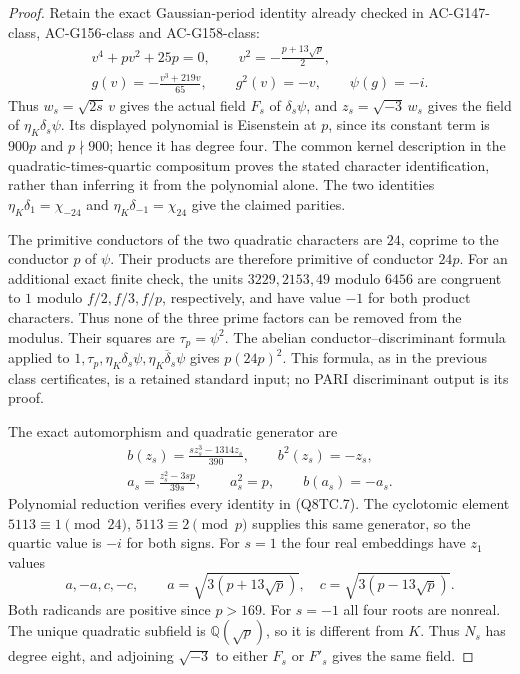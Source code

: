 \begin{proof}
Retain the exact Gaussian-period identity already checked in
AC-G147-class, AC-G156-class and AC-G158-class:
\[
 \begin{gathered}
 v^4+pv^2+25p=0,\qquad
 v^2=-\frac{p+13\sqrt p}{2},\\
 g(v)=-\frac{v^3+219v}{65},\qquad g^2(v)=-v,
                  \qquad\psi(g)=-i .
 \end{gathered}
 \tag{Q8TC.6}
\]
Thus $w_s=\sqrt{2s}\,v$ gives the actual field $F_s$ of
$\delta_s\psi$, and $z_s=\sqrt{-3}\,w_s$ gives the field
of $\eta_K\delta_s\psi$.
Its displayed polynomial is Eisenstein at $p$, since its constant
term is $900p$ and $p\nmid900$; hence it has degree four.
The common kernel description in the quadratic-times-quartic
compositum proves the stated character identification, rather
than inferring it from the polynomial alone.
The two identities
$\eta_K\delta_1=\chi_{-24}$ and
$\eta_K\delta_{-1}=\chi_{24}$ give the claimed parities.

The primitive conductors of the two quadratic characters are
$24$, coprime to the conductor $p$ of $\psi$.
Their products are therefore primitive of conductor $24p$.
For an additional exact finite check, the units
$3229,2153,49$ modulo $6456$ are congruent to $1$ modulo
$f/2,f/3,f/p$, respectively, and have value $-1$ for both
product characters.  Thus none of the three prime factors can
be removed from the modulus.
Their squares are $\tau_p=\psi^2$.
The abelian conductor--discriminant formula applied to
$1,\tau_p,\eta_K\delta_s\psi,
\overline{\eta_K\delta_s\psi}$ gives $p(24p)^2$.
This formula, as in the previous class certificates, is a
retained standard input; no PARI discriminant output is its proof.

The exact automorphism and quadratic generator are
\[
 \begin{gathered}
 b(z_s)=\frac{s z_s^3-1314z_s}{390},\qquad
 b^2(z_s)=-z_s,\\
 a_s=\frac{z_s^2-3sp}{39s},\qquad
 a_s^2=p,\qquad b(a_s)=-a_s.
 \end{gathered}
 \tag{Q8TC.7}
\]
Polynomial reduction verifies every identity in (Q8TC.7).
The cyclotomic element $5113\equiv1\pmod{24}$,
$5113\equiv2\pmod p$ supplies this same generator, so the
quartic value is $-i$ for both signs.
For $s=1$ the four real embeddings have $z_1$ values
\[
       a,-a,c,-c,\qquad
       a=\sqrt{3(p+13\sqrt p)},\quad
       c=\sqrt{3(p-13\sqrt p)}.
 \tag{Q8TC.8}
\]
Both radicands are positive since $p>169$.
For $s=-1$ all four roots are nonreal.
The unique quadratic subfield is $\mathbb Q(\sqrt p)$,
so it is different from $K$.  Thus $N_s$ has degree eight,
and adjoining $\sqrt{-3}$ to either $F_s$ or $F'_s$ gives
the same field.


\end{proof}
